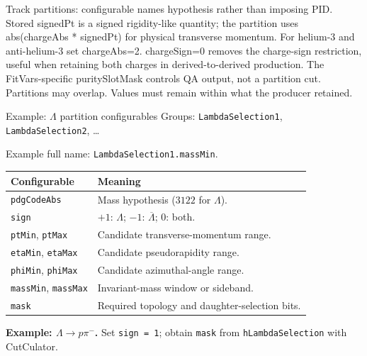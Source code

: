 \begin{frame}[shrink=8]{Track partitions: configurable names}
{                hypothesis rather than imposing PID. Stored signedPt is a
                signed rigidity-like quantity; the partition uses
                abs(chargeAbs * signedPt) for physical transverse momentum.
                For helium-3 and anti-helium-3 set chargeAbs=2. chargeSign=0
                removes the charge-sign restriction, useful when retaining
                both charges in derived-to-derived production. The
                FitVars-specific puritySlotMask controls QA output, not a
                partition cut. Partitions may overlap. Values must remain
        within what the producer retained.}
\end{frame}

\begin{frame}[shrink=8]{Example: $\Lambda$ partition configurables}
        \small Groups: \texttt{LambdaSelection1},
        \texttt{LambdaSelection2}, \ldots\par
        Example full name: \texttt{LambdaSelection1.massMin}.
        \medskip
        \footnotesize
        \renewcommand{\arraystretch}{1.3}
        \begin{tabular}{p{}p{}}
                \toprule
                Configurable & Meaning\\
                \midrule
                \texttt{pdgCodeAbs} & Mass hypothesis ($3122$ for $\Lambda$).\\
                \texttt{sign} & $+1$: $\Lambda$; $-1$:
                $\overline\Lambda$; $0$: both.\\
                \texttt{ptMin}, \texttt{ptMax} & Candidate
                transverse-momentum range.\\
                \texttt{etaMin}, \texttt{etaMax} & Candidate
                pseudorapidity range.\\
                \texttt{phiMin}, \texttt{phiMax} & Candidate
                azimuthal-angle range.\\
                \texttt{massMin}, \texttt{massMax} & Invariant-mass
                window or sideband.\\
                \texttt{mask} & Required topology and daughter-selection bits.\\
                \bottomrule
        \end{tabular}
        \medskip
        \small
        \textbf{Example: $\Lambda\to p\pi^-$.} Set \texttt{sign = 1};
        obtain \texttt{mask} from \texttt{hLambdaSelection} with CutCulator.

\end{frame}
